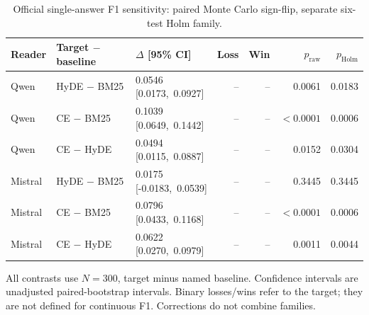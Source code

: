 \begin{table}[htbp]
\centering\footnotesize
\setlength{\tabcolsep}{3pt}
\renewcommand{\arraystretch}{1.08}
\caption{Official single-answer F1 sensitivity: paired Monte Carlo sign-flip, separate six-test Holm family.}
\label{tab:followup_holdout_official_f1}
\begin{tabularx}{\textwidth}{l l >{\centering\arraybackslash}X r r r r}
\toprule
Reader & Target $-$ baseline & $\Delta$ [95\% CI] & Loss & Win & $p_{\mathrm{raw}}$ & $p_{\mathrm{Holm}}$ \\
\midrule
Qwen & HyDE $-$ BM25 & \shortstack{0.0546\\\mbox{[0.0173, 0.0927]}} & -- & -- & 0.0061 & 0.0183 \\
Qwen & CE $-$ BM25 & \shortstack{0.1039\\\mbox{[0.0649, 0.1442]}} & -- & -- & $<0.0001$ & 0.0006 \\
Qwen & CE $-$ HyDE & \shortstack{0.0494\\\mbox{[0.0115, 0.0887]}} & -- & -- & 0.0152 & 0.0304 \\
Mistral & HyDE $-$ BM25 & \shortstack{0.0175\\\mbox{[-0.0183, 0.0539]}} & -- & -- & 0.3445 & 0.3445 \\
Mistral & CE $-$ BM25 & \shortstack{0.0796\\\mbox{[0.0433, 0.1168]}} & -- & -- & $<0.0001$ & 0.0006 \\
Mistral & CE $-$ HyDE & \shortstack{0.0622\\\mbox{[0.0270, 0.0979]}} & -- & -- & 0.0011 & 0.0044 \\
\bottomrule
\end{tabularx}
\begin{tablenotes}\footnotesize
\item All contrasts use $N=300$, target minus named baseline. Confidence intervals are unadjusted paired-bootstrap intervals. Binary losses/wins refer to the target; they are not defined for continuous F1. Corrections do not combine families.
\end{tablenotes}
\end{table}


